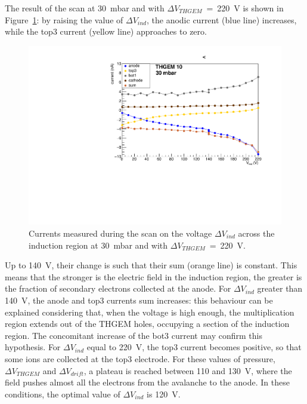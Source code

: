 \documentclass[a4paper, 11 pt]{article}
\newcommand{\Vind}{$\Delta V_{ind}$}
\newcommand{\Vthgem}{$\Delta V_{THGEM}$}
\newcommand{\Vdrift}{$ \Delta V_{drift}$}
\begin{document}
The result of the scan at 30~mbar and with \Vthgem{}~=~220~V is shown in Figure~\ref{fig:induction_FULLTHGEM_30mbar}: by raising the value of \Vind{}, the anodic current (blue line) increases, while the top3 current (yellow line) approaches to zero.
\begin{figure}[!t]
	\centering
	\includegraphics[width=\textwidth]{Immagini/inductionScan_THGEM10_30mbar.pdf}
	\caption{Currents measured during the scan on the voltage \Vind{} across the induction region at 30~mbar and with \Vthgem{}~=~220~V.}
	\label{fig:induction_FULLTHGEM_30mbar}
\end{figure}
Up to 140~V, their change is such that their sum (orange line) is constant.
This means that the stronger is the electric field in the induction region, the greater is the fraction of secondary electrons collected at the anode.
For \Vind{} greater than 140~V, the anode and top3 currents sum increases: this behaviour can be explained considering that, when the voltage is high enough, the multiplication region extends out of the THGEM holes, occupying a section of the induction region.
The concomitant increase of the bot3 current may confirm this hypothesis.
For \Vind{} equal to 220~V, the top3 current becomes positive, so that some ions are collected at the top3 electrode.
For these values of pressure, \Vthgem{} and \Vdrift, a plateau is reached between 110 and 130~V, where the field pushes almost all the electrons from the avalanche to the anode.
In these conditions, the optimal value of \Vind{} is 120~V.
\end{document}
